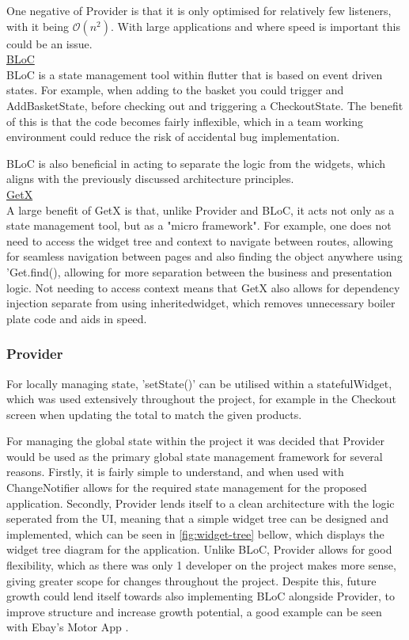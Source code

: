 \documentclass[12pt]{article}
\begin{document}
	One negative of Provider is that it is only optimised for relatively few listeners, with it being $\mathcal{O}(n^2)$. With large applications and where speed is important this could be an issue.
	\\
	
	\noindent \underline{BLoC}
	\\
	BLoC is a state management tool within flutter that is based on event driven states. For example, when adding to the basket you could trigger and AddBasketState, before checking out and triggering a CheckoutState. The benefit of this is that the code becomes fairly inflexible, which in a team working environment could reduce the risk of accidental bug implementation.
	
	BLoC is also beneficial in acting to separate the logic from the widgets, which aligns with the previously discussed architecture principles.
	\\
	

	\noindent \underline{GetX}
	\\
	\noindent
	A large benefit of GetX is that, unlike Provider and BLoC, it acts not only as a state management tool, but as a "micro framework". For example, one does not need to access the widget tree and context to navigate between routes, allowing for seamless navigation between pages and also finding the object anywhere using 'Get.find(), allowing for more separation between the business and presentation logic. Not needing to access context means that GetX also allows for dependency injection separate from using inheritedwidget, which removes unnecessary boiler plate code and aids in speed.

	
	\subsubsection{Provider}
	For locally managing state, 'setState()' can be utilised within a statefulWidget, which was used extensively throughout the project, for example in the Checkout screen when updating the total to match the given products.
	
	For managing the global state within the project it was decided that Provider would be used as the primary global state management framework for several reasons. Firstly, it is fairly simple to understand, and when used with ChangeNotifier allows for the required state management for the proposed application. Secondly, Provider lends itself to a clean architecture with the logic seperated from the UI, meaning that a simple widget tree can be designed and implemented, which can be seen in \autoref{fig:widget-tree} bellow, which displays the widget tree diagram for the application. Unlike BLoC, Provider allows for good flexibility, which as there was only 1 developer on the project makes more sense, giving greater scope for changes throughout the project. Despite this, future growth could lend itself towards also implementing BLoC alongside Provider, to improve structure and increase growth potential, a good example can be seen with Ebay's Motor App \cite{techblogEBayMotorsState2021}.
	
\end{document}

